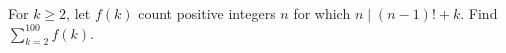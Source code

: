 For $k\ge2$, let $f(k)$ count positive integers $n$ for which $n\mid(n-1)!+k$. Find $\sum_{k=2}^{100}f(k)$.
